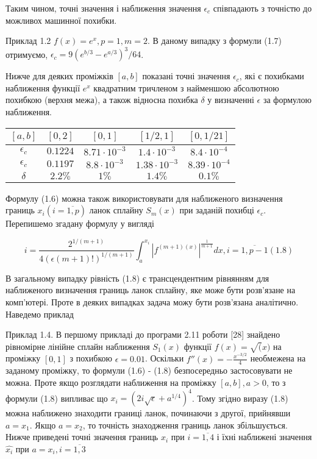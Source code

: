 \documentclass[ukrainian,14pt]{extarticle}
\begin{document}
Таким чином, точні значення і наближення значення $\epsilon_c$ співпадають з точністю до можливох машинної похибки.

Приклад 1.2 $f(x) = e^x, p = 1, m = 2$. В даному випадку з формули (1.7) отримуємо, $\epsilon_c = 9 (e^{b/3} - e^{a/3})^3 / 64$.

Нижче для деяких проміжків $[a, b]$ показані точні значення $\epsilon_c$, які є похибками наближення функції $e^x$ квадратним тричленом з найменшою абсолютною похибкою (верхня межа), а також відносна похибка $\delta$ у визначенні $\epsilon$ за формулою наближення.

\bgroup
\def\arraystretch{1.5}%
\begin{center}
\begin{tabular}{ c | c |
c | c | c }
 $[a, b]$ & $[0,2]$ & $[0,1]$ & $[1/2,1]$ & $[0,1/21]$ \\
 \hline
 $\epsilon_c$ & $0.1224$ & $8.71 \cdot 10^{-3}$ & $1.4 \cdot 10^{-3}$ & $8.4 \cdot 10^{-4}$ \\  
 \hline
  $\epsilon_c$ & $0.1197$ & $8.8 \cdot 10^{-3}$ & $1.38 \cdot 10^{-3}$ & $8.39 \cdot 10^{-4}$\\  
 \hline
 $\delta$ & $2.2\%$ & $1\%$ & $1.4\%$ & $0.1\%$    
\end{tabular}
\end{center}
\egroup

Формулу (1.6) можна також використовувати для наближеного визначення границь $x_i (i = \overline{1,p})$ ланок сплайну $S_m(x)$ при заданій похибці $\epsilon_c$. Перепишемо згадану формулу у вигляді

$$i = \frac{2^{1/(m+1)}}{4(\epsilon (m+1)!)^{1/(m+1)}} \int_a^{x_i} \left| f^{(m+1) (x)} \right|^{\frac{1}{m+1}} dx, i = \overline{1, p-1} (1.8)$$ 

В загальному випадку рівність (1.8) є трансцендентним рівнянням для наближеного визначення границь ланок сплайну, яке може бути розв'язане на комп'ютері. Проте в деяких випадках задача можу бути розв'язана аналітично. Наведемо приклад

Приклад 1.4. В першому прикладі до програми 2.11 роботи [28] знайдено рівномірне лінійне сплайн наближення $S_1(x)$ функції $f(x) = \sqrt(x)$ на проміжку $[0,1]$ з похибкою $\epsilon = 0.01$. Оскільки $f''(x) = -\frac{x^{-3/2}}{4}$ необмежена на заданому проміжку, то формули (1.6) - (1.8) безпосередньо застосовувати не можна. Проте якщо розглядати наближення на проміжку $[a, b], a > 0$, то з формули (1.8) випливає що $x_i = (2i \sqrt{\epsilon} + a^{1/4})^{4}$. Тому згідно виразу (1.8) можна наближено знаходити границі ланок, починаючи з другої, прийнявши $a = x_1$. Якщо $a = x_2$, то точність знаходження границь ланок збільшується. Нижче приведені точні значення границь $x_i$ при $i = \overline{1, 4}$ і їхні наближені значення $\hat{x_i}$ при $a = x_i, i = \overline{1,3}$
\end{document}
